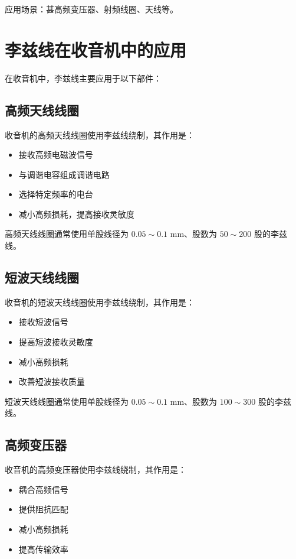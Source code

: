 \documentclass[12pt,UTF8]{ctexbook}
\begin{document}
应用场景：甚高频变压器、射频线圈、天线等。

\section{李兹线在收音机中的应用}

在收音机中，李兹线主要应用于以下部件：

\subsection{高频天线线圈}

收音机的高频天线线圈使用李兹线绕制，其作用是：

\begin{itemize}[leftmargin=2cm]
    \item 接收高频电磁波信号
    \item 与调谐电容组成调谐电路
    \item 选择特定频率的电台
    \item 减小高频损耗，提高接收灵敏度
\end{itemize}

高频天线线圈通常使用单股线径为 $0.05 \sim 0.1$ mm、股数为 $50 \sim 200$ 股的李兹线。

\subsection{短波天线线圈}

收音机的短波天线线圈使用李兹线绕制，其作用是：

\begin{itemize}[leftmargin=2cm]
    \item 接收短波信号
    \item 提高短波接收灵敏度
    \item 减小高频损耗
    \item 改善短波接收质量
\end{itemize}

短波天线线圈通常使用单股线径为 $0.05 \sim 0.1$ mm、股数为 $100 \sim 300$ 股的李兹线。

\subsection{高频变压器}

收音机的高频变压器使用李兹线绕制，其作用是：

\begin{itemize}[leftmargin=2cm]
    \item 耦合高频信号
    \item 提供阻抗匹配
    \item 减小高频损耗
    \item 提高传输效率
\end{itemize}
\end{document}
